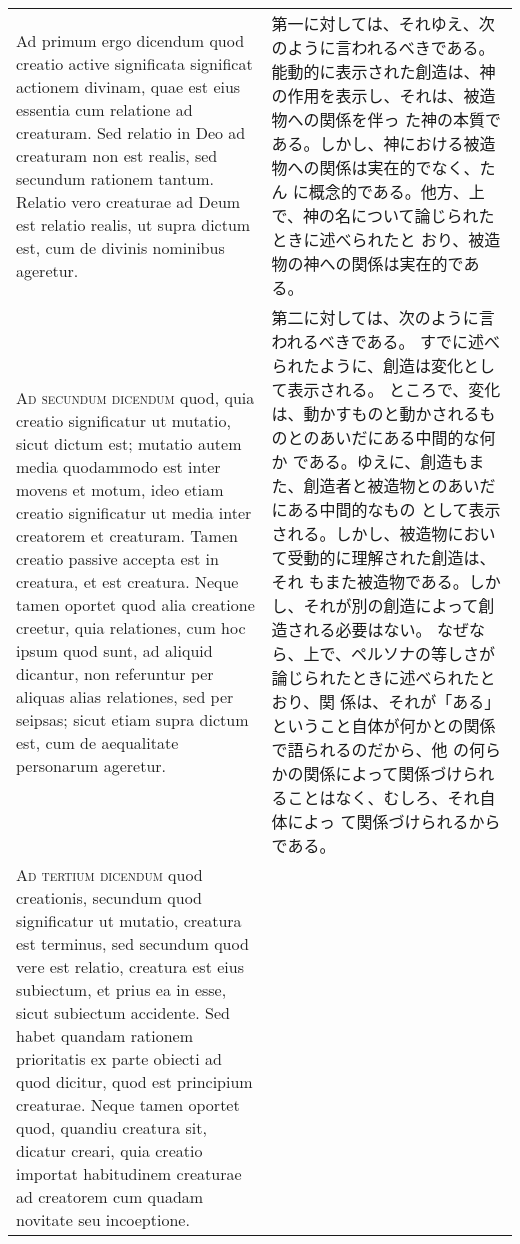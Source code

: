 \documentclass[10pt]{jsarticle} %
\begin{document}
\begin{longtable}{p{21em}p{21em}}
\\

Ad primum ergo dicendum quod creatio active significata significat
 actionem divinam, quae est eius essentia cum relatione ad
 creaturam. Sed relatio in Deo ad creaturam non est realis, sed secundum
 rationem tantum. Relatio vero creaturae ad Deum est relatio realis, ut
 supra dictum est, cum de divinis nominibus ageretur.

&

第一に対しては、それゆえ、次のように言われるべきである。
能動的に表示された創造は、神の作用を表示し、それは、被造物への関係を伴っ
 た神の本質である。しかし、神における被造物への関係は実在的でなく、たん
 に概念的である。他方、上で、神の名について論じられたときに述べられたと
 おり、被造物の神への関係は実在的である。


\\

{\scshape Ad secundum dicendum} quod, quia creatio significatur ut
 mutatio, sicut dictum est; mutatio autem media quodammodo est inter
 movens et motum, ideo etiam creatio significatur ut media inter
 creatorem et creaturam. Tamen creatio passive accepta est in creatura,
 et est creatura. Neque tamen oportet quod alia creatione creetur, quia
 relationes, cum hoc ipsum quod sunt, ad aliquid dicantur, non
 referuntur per aliquas alias relationes, sed per seipsas; sicut etiam
 supra dictum est, cum de aequalitate personarum ageretur.

&

第二に対しては、次のように言われるべきである。
すでに述べられたように、創造は変化として表示される。
ところで、変化は、動かすものと動かされるものとのあいだにある中間的な何か
 である。ゆえに、創造もまた、創造者と被造物とのあいだにある中間的なもの
 として表示される。しかし、被造物において受動的に理解された創造は、それ
 もまた被造物である。しかし、それが別の創造によって創造される必要はない。
 なぜなら、上で、ペルソナの等しさが論じられたときに述べられたとおり、関
 係は、それが「ある」ということ自体が何かとの関係で語られるのだから、他
 の何らかの関係によって関係づけられることはなく、むしろ、それ自体によっ
 て関係づけられるからである。

\\

{\scshape Ad tertium dicendum} quod creationis, secundum quod significatur ut
 mutatio, creatura est terminus, sed secundum quod vere est relatio,
 creatura est eius subiectum, et prius ea in esse, sicut subiectum
 accidente. Sed habet quandam rationem prioritatis ex parte obiecti ad
 quod dicitur, quod est principium creaturae. Neque tamen oportet quod,
 quandiu creatura sit, dicatur creari, quia creatio importat habitudinem
 creaturae ad creatorem cum quadam novitate seu incoeptione.


\end{longtable}
\end{document}
